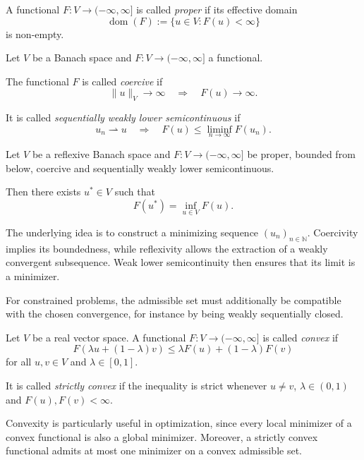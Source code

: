 \begin{definition}
	A functional $F:V\to(-\infty,\infty]$ is called \emph{proper} if its effective domain 
	$$
	\operatorname{dom}(F) := \{u\in V: F(u)<\infty\}
	$$
is non-empty.
\end{definition}

\begin{definition}
    Let $V$ be a Banach space and
    $F:V\to(-\infty,\infty]$ a functional.

    The functional $F$ is called
    \emph{coercive} if
    \[
        \|u\|_V\to\infty
        \quad\Longrightarrow\quad
        F(u)\to\infty.
    \]

    It is called \emph{sequentially weakly
    lower semicontinuous} if
    \[
        u_n\rightharpoonup u
        \quad\Longrightarrow\quad
        F(u)\leq\liminf_{n\to\infty}F(u_n).
    \]
\end{definition}
\begin{theorem}
    Let $V$ be a reflexive Banach space and
    $F:V\to(-\infty,\infty]$ be proper,
    bounded from below, coercive and
    sequentially weakly lower semicontinuous.

    Then there exists $u^*\in V$ such that
    \[
        F(u^*)=\inf_{u\in V}F(u).
    \]
\end{theorem}

The underlying idea is to construct a minimizing
sequence $(u_n)_{n\in\mathbb{N}}$. Coercivity
implies its boundedness, while reflexivity
allows the extraction of a weakly convergent
subsequence. Weak lower semicontinuity then
ensures that its limit is a minimizer.

For constrained problems, the admissible set
must additionally be compatible with the
chosen convergence, for instance by being
weakly sequentially closed.

\begin{definition}
    Let $V$ be a real vector space.
    A functional $F:V\to(-\infty,\infty]$
    is called \emph{convex} if
    \[
        F(\lambda u+(1-\lambda)v)
        \leq \lambda F(u)+(1-\lambda)F(v)
    \]
    for all $u,v\in V$ and
    $\lambda\in[0,1]$.

    It is called \emph{strictly convex} if
    the inequality is strict whenever
    $u\neq v$, $\lambda\in(0,1)$ and
    $F(u),F(v)<\infty$.
\end{definition}

Convexity is particularly useful in
optimization, since every local minimizer
of a convex functional is also a global
minimizer. Moreover, a strictly convex
functional admits at most one minimizer
on a convex admissible set.

